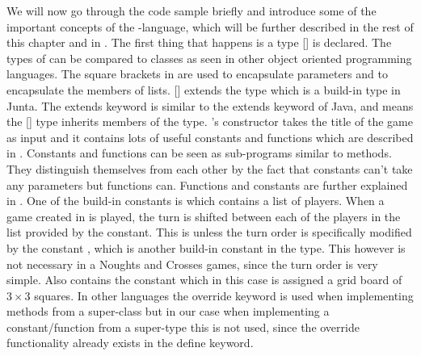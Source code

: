 We will now go through the code sample briefly and introduce some of the important concepts
of the \productname{}-language, which will be further described in the rest of this chapter and in .
The first thing that happens is a type  [] is declared. The types of \productname{} can be compared 
to classes as seen in other object oriented programming languages. The square brackets in \productname{} are used to encapsulate parameters and to encapsulate the members of lists.  [] extends the  type which
is a build-in type in Junta. The extends keyword is similar to the extends keyword of Java, and means the  [] type inherits members of the  type. 's constructor takes the title of the game as input and it contains lots of useful constants and functions which are described in . Constants and functions can be seen as sub-programs similar to methods. They distinguish themselves from each other by the fact that constants can't take any parameters but functions can. Functions and constants are further explained in .  One of the build-in constants is  which contains a list of players. When a game created in \productname{} is played, the turn is shifted between each of the players in the list provided by the 
 constant. This is unless the turn order is specifically modified by the constant , which is another build-in
constant in the  type. This however is not necessary in a Noughts and Crosses games, since the turn order is very simple. Also  contains the constant  which in this case is assigned a grid board of $3 \times 3$ squares. In other languages the override keyword is used when implementing methods from a super-class but in our case when implementing a constant/function from a super-type this is not used, since the override functionality already exists in the define keyword.

